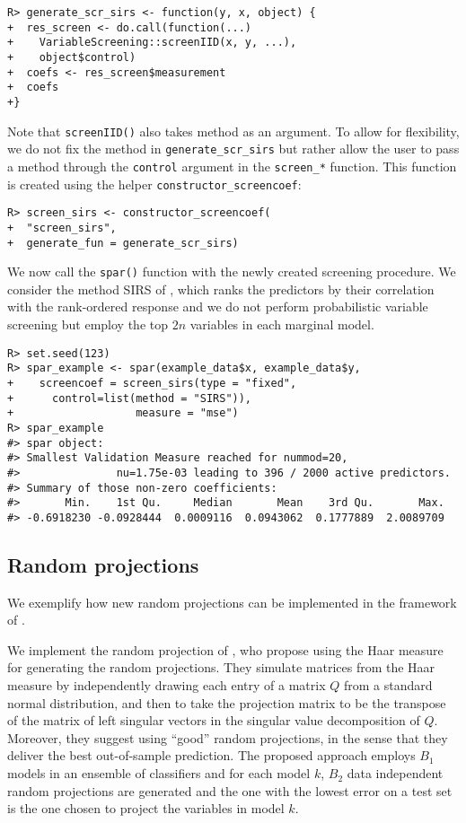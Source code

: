 \documentclass[
  article]{jss}
\begin{document}
\begin{verbatim}
R> generate_scr_sirs <- function(y, x, object) {
+  res_screen <- do.call(function(...) 
+    VariableScreening::screenIID(x, y, ...), 
+    object$control)
+  coefs <- res_screen$measurement
+  coefs
+}
\end{verbatim}

Note that \texttt{screenIID()} also takes method as an argument. To
allow for flexibility, we do not fix the method in
\texttt{generate\_scr\_sirs} but rather allow the user to pass a method
through the \texttt{control} argument in the \texttt{screen\_*}
function. This function is created using the helper
\texttt{constructor\_screencoef}:

\begin{verbatim}
R> screen_sirs <- constructor_screencoef(
+  "screen_sirs", 
+  generate_fun = generate_scr_sirs)
\end{verbatim}

We now call the \texttt{spar()} function with the newly created
screening procedure. We consider the method SIRS of
\citet{zhu2011model}, which ranks the predictors by their correlation
with the rank-ordered response and we do not perform probabilistic
variable screening but employ the top \(2n\) variables in each marginal
model.

\begin{verbatim}
R> set.seed(123)      
R> spar_example <- spar(example_data$x, example_data$y,
+    screencoef = screen_sirs(type = "fixed",
+      control=list(method = "SIRS")),
+                   measure = "mse")
R> spar_example
#> spar object:
#> Smallest Validation Measure reached for nummod=20,
#>               nu=1.75e-03 leading to 396 / 2000 active predictors.
#> Summary of those non-zero coefficients:
#>       Min.    1st Qu.     Median       Mean    3rd Qu.       Max. 
#> -0.6918230 -0.0928444  0.0009116  0.0943062  0.1777889  2.0089709
\end{verbatim}

\subsection{Random projections}\label{random-projections-1}

We exemplify how new random projections can be implemented in the
framework of .

We implement the random projection of \citet{cannings2017random}, who
propose using the Haar measure for generating the random projections.
They simulate matrices from the Haar measure by independently drawing
each entry of a matrix \(Q\) from a standard normal distribution, and
then to take the projection matrix to be the transpose of the matrix of
left singular vectors in the singular value decomposition of \(Q\).
Moreover, they suggest using ``good'' random projections, in the sense
that they deliver the best out-of-sample prediction. The proposed
approach employs \(B_1\) models in an ensemble of classifiers and for
each model \(k\), \(B_2\) data independent random projections are
generated and the one with the lowest error on a test set is the one
chosen to project the variables in model \(k\).
\end{document}
